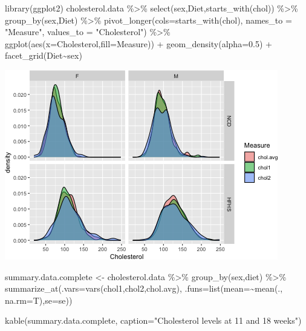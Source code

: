 \documentclass[
]{article}
\newenvironment{Shaded}{\begin{snugshade}}{\end{snugshade}}
\newcommand{\AttributeTok}[1]{\textcolor[rgb]{0.77,0.63,0.00}{#1}}
\newcommand{\FloatTok}[1]{\textcolor[rgb]{0.00,0.00,0.81}{#1}}
\newcommand{\FunctionTok}[1]{\textcolor[rgb]{0.00,0.00,0.00}{#1}}
\newcommand{\NormalTok}[1]{#1}
\newcommand{\OtherTok}[1]{\textcolor[rgb]{0.56,0.35,0.01}{#1}}
\newcommand{\SpecialCharTok}[1]{\textcolor[rgb]{0.00,0.00,0.00}{#1}}
\newcommand{\StringTok}[1]{\textcolor[rgb]{0.31,0.60,0.02}{#1}}
\begin{document}
\begin{Shaded}
\begin{Highlighting}[]
\FunctionTok{library}\NormalTok{(ggplot2)}
\NormalTok{cholesterol.data }\SpecialCharTok{\%\textgreater{}\%}
  \FunctionTok{select}\NormalTok{(sex,Diet,}\FunctionTok{starts\_with}\NormalTok{(}\StringTok{\textquotesingle{}chol\textquotesingle{}}\NormalTok{)) }\SpecialCharTok{\%\textgreater{}\%}
  \FunctionTok{group\_by}\NormalTok{(sex,Diet) }\SpecialCharTok{\%\textgreater{}\%}
  \FunctionTok{pivot\_longer}\NormalTok{(}\AttributeTok{cols=}\FunctionTok{starts\_with}\NormalTok{(}\StringTok{\textquotesingle{}chol\textquotesingle{}}\NormalTok{),}
               \AttributeTok{names\_to =} \StringTok{"Measure"}\NormalTok{,}
               \AttributeTok{values\_to =} \StringTok{"Cholesterol"}\NormalTok{) }\SpecialCharTok{\%\textgreater{}\%}
  \FunctionTok{ggplot}\NormalTok{(}\FunctionTok{aes}\NormalTok{(}\AttributeTok{x=}\NormalTok{Cholesterol,}\AttributeTok{fill=}\NormalTok{Measure)) }\SpecialCharTok{+}
  \FunctionTok{geom\_density}\NormalTok{(}\AttributeTok{alpha=}\FloatTok{0.5}\NormalTok{) }\SpecialCharTok{+}
  \FunctionTok{facet\_grid}\NormalTok{(Diet}\SpecialCharTok{\textasciitilde{}}\NormalTok{sex)}
\end{Highlighting}
\end{Shaded}

\includegraphics{figures/cholesterol-normality-1.png}

\begin{Shaded}
\begin{Highlighting}[]
\NormalTok{summary.data.complete }\OtherTok{\textless{}{-}}
\NormalTok{  cholesterol.data }\SpecialCharTok{\%\textgreater{}\%}
  \FunctionTok{group\_by}\NormalTok{(sex,diet) }\SpecialCharTok{\%\textgreater{}\%}
  \FunctionTok{summarize\_at}\NormalTok{(}\AttributeTok{.vars=}\FunctionTok{vars}\NormalTok{(chol1,chol2,chol.avg), }\AttributeTok{.funs=}\FunctionTok{list}\NormalTok{(}\AttributeTok{mean=}\SpecialCharTok{\textasciitilde{}}\FunctionTok{mean}\NormalTok{(., }\AttributeTok{na.rm=}\NormalTok{T),}\AttributeTok{se=}\NormalTok{se))}

\FunctionTok{kable}\NormalTok{(summary.data.complete, }\AttributeTok{caption=}\StringTok{"Cholesterol levels at 11 and 18 weeks"}\NormalTok{)}
\end{Highlighting}
\end{Shaded}
\end{document}
